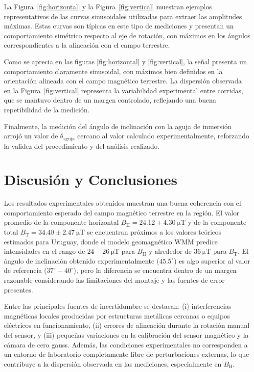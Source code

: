\documentclass[12pt,a4paper]{article}
\begin{document}
\vspace{1em}
La Figura~\ref{fig:horizontal} y la Figura~\ref{fig:vertical} muestran ejemplos representativos de las curvas sinusoidales utilizadas para extraer las amplitudes máximas. Estas curvas son típicas en este tipo de mediciones y presentan un comportamiento simétrico respecto al eje de rotación, con máximos en los ángulos correspondientes a la alineación con el campo terrestre.

\vspace{1em}
Como se aprecia en las figuras \ref{fig:horizontal} y \ref{fig:vertical}, la señal presenta un comportamiento claramente sinusoidal, con máximos bien definidos en la orientación alineada con el campo magnético terrestre. La dispersión observada en la Figura~\ref{fig:vertical} representa la variabilidad experimental entre corridas, que se mantuvo dentro de un margen controlado, reflejando una buena repetibilidad de la medición.

\vspace{1em}
Finalmente, la medición del ángulo de inclinación con la aguja de inmersión arrojó un valor de \(\theta_\text{aguja}\) cercano al valor calculado experimentalmente, reforzando la validez del procedimiento y del análisis realizado.



\section{Discusión y Conclusiones}

Los resultados experimentales obtenidos muestran una buena coherencia con el comportamiento esperado del campo magnético terrestre en la región. El valor promedio de la componente horizontal \( B_\mathrm{H} = 24.12 \pm 4.30~\si{\micro\tesla} \) y de la componente total \( B_\mathrm{T} = 34.40 \pm 2.47~\si{\micro\tesla} \) se encuentran próximos a los valores teóricos estimados para Uruguay, donde el modelo geomagnético WMM predice intensidades en el rango de \( 24{-}26~\si{\micro\tesla} \) para \( B_\mathrm{H} \) y alrededor de \( 36~\si{\micro\tesla} \) para \( B_\mathrm{T} \). El ángulo de inclinación obtenido experimentalmente (\( 45.5^\circ \)) es algo superior al valor de referencia (\( 37^\circ{-}40^\circ \)), pero la diferencia se encuentra dentro de un margen razonable considerando las limitaciones del montaje y las fuentes de error presentes.

Entre las principales fuentes de incertidumbre se destacan: (i) interferencias magnéticas locales producidas por estructuras metálicas cercanas o equipos eléctricos en funcionamiento, (ii) errores de alineación durante la rotación manual del sensor, y (iii) pequeñas variaciones en la calibración del sensor magnético y la cámara de cero gauss. Además, las condiciones experimentales no corresponden a un entorno de laboratorio completamente libre de perturbaciones externas, lo que contribuye a la dispersión observada en las mediciones, especialmente en \( B_\mathrm{H} \).
\end{document}
